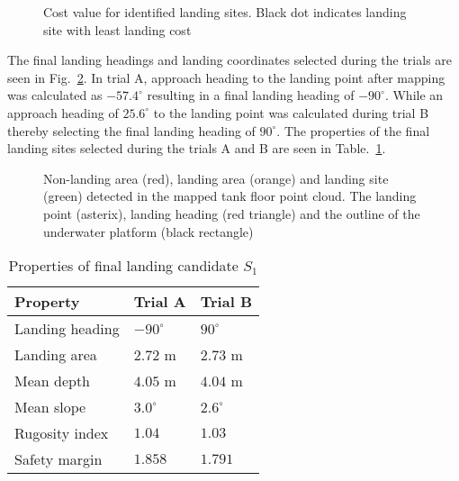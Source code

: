 \begin{figure}[!ht]
\centering
{}
\caption{Cost value for identified landing sites. Black dot indicates landing site with least landing cost}
\label{f:trial_la_cost}
\end{figure}

The final landing headings and landing coordinates selected during the trials are seen in Fig.~\ref{f:trial_landing_point}. In trial A, approach heading to the landing point after mapping was calculated as $-57.4^\circ$ resulting in a  final landing heading of $-90^\circ$. While an approach heading of $25.6^\circ$ to the landing point was calculated during trial B thereby selecting the final landing heading of $90^\circ$. The properties of the final landing sites selected during the trials A and B are seen in Table.~\ref{t:trial_land_stats}. 

\begin{figure}[!ht]
\centering
{}\quad
{}
\caption{Non-landing area (red), landing area (orange) and landing site (green) detected in the mapped tank floor point cloud. The landing point (asterix), landing heading (red triangle) and the outline of the underwater platform (black rectangle)}
\label{f:trial_landing_point}
\end{figure}


\begin{table}[!ht]
\centering
\caption{Properties of final landing candidate $S_1$}
\begin{tabular}{ | p{6cm}  p{3cm} p{3cm} |}
\hline
\textbf{Property} & \textbf{Trial A} & \textbf{Trial B}\\ \hline
Landing heading & $-90^\circ$ & $90^\circ$\\
Landing area & $2.72$ m & $2.73$ m\\
Mean depth & $4.05$ m & $4.04$ m\\
Mean slope & $3.0^\circ$ & $2.6^\circ$\\
Rugosity index & $1.04$ & $1.03$\\
Safety margin & $1.858$ & $1.791$ \\
\hline
\end{tabular}
\label{t:trial_land_stats}
\end{table}

